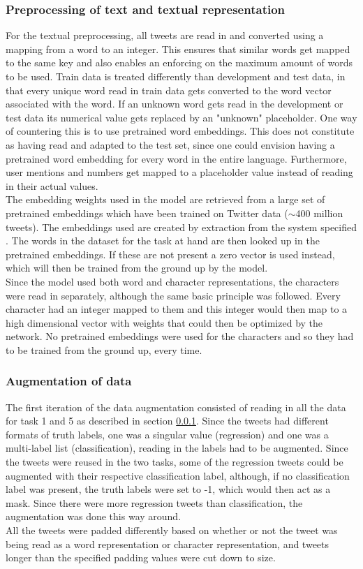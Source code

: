 \subsubsection{Preprocessing of text and textual representation} \label{sec:preprop}
For the textual preprocessing, all tweets are read in and converted using a mapping from a word to an integer. This ensures that similar words get mapped to the same key and also enables an enforcing on the maximum amount of words to be used. Train data is treated differently than development and test data, in that every unique word read in train data gets converted to the word vector associated with the word. If an unknown word gets read in the development or test data its numerical value gets replaced by an "unknown" placeholder. One way of countering this is to use pretrained word embeddings. This does not constitute as having read and adapted to the test set, since one could envision having a pretrained word embedding for every word in the entire language. Furthermore, user mentions and numbers get mapped to a placeholder value instead of reading in their actual values.\\
The embedding weights used in the model are retrieved from a large set of pretrained embeddings which have been trained on Twitter data ($\sim$400 million tweets). The embeddings used are created by extraction from the system specified \cite{godin}. The words in the dataset for the task at hand are then looked up in the pretrained embeddings. If these are not present a zero vector is used instead, which will then be trained from the ground up by the model.\\
Since the model used both word and character representations, the characters were read in separately, although the same basic principle was followed. Every character had an integer mapped to them and this integer would then map to a high dimensional vector with weights that could then be optimized by the network. No pretrained embeddings were used for the characters and so they had to be trained from the ground up, every time.

\subsubsection{Augmentation of data} \label{sec:augm}
The first iteration of the data augmentation consisted of reading in all the data for task 1 and 5 as described in section \ref{sec:preprop}. Since the tweets had different formats of truth labels, one was a singular value (regression) and one was a multi-label list (classification), reading in the labels had to be augmented. Since the tweets were reused in the two tasks, some of the regression tweets could be augmented with their respective classification label, although, if no classification label was present, the truth labels were set to -1, which would then act as a mask. Since there were more regression tweets than classification, the augmentation was done this way around.\\
All the tweets were padded differently based on whether or not the tweet was being read as a word representation or character representation, and tweets longer than the specified padding values were cut down to size. 


